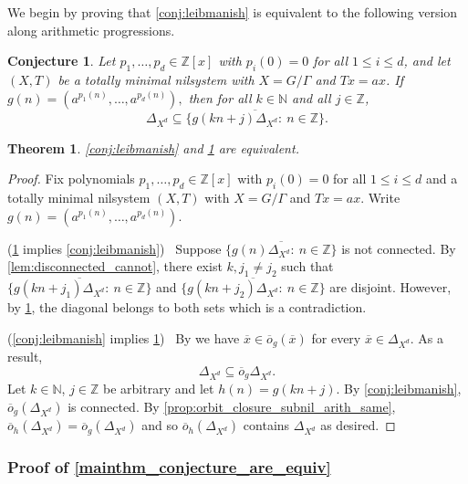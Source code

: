 \documentclass{article}
\theoremstyle{plain}
\newtheorem{theorem}[Theorem]{Theorem}
\newtheorem{Conjecture}[Theorem]{Conjecture}
\theoremstyle{claim}
\theoremstyle{definition}
\theoremstyle{plain}
\theoremstyle{plain}
\newcommand{\N}{\mathbb{N}}
\newcommand{\Z}{\mathbb{Z}}
\newcommand{\1}{\boldsymbol{1}}
\newcommand{\orb}{\overline{o}}
\begin{document}
We begin by proving that \cref{conj:leibmanish} is equivalent to the following version along arithmetic progressions.

\begin{Conjecture}
\label{lem:connected_pol_first}
Let $p_1, \ldots, p_d \in \Z[x]$ with $p_i(0) = 0$ for all $1 \le i \le d$, and let $(X,T)$ be a totally minimal nilsystem with $X = G/\Gamma$ and $Tx = ax$. If $g(n) = (a^{p_1(n)},\dots,a^{p_d(n)}),$ then for all $k \in \N$ and all $j \in \Z$,
\[
\Delta_{X^d} \subseteq \overline{\{g(kn+j) \Delta_{X^{d}}: \ n \in \Z\}}.
\]
\end{Conjecture}




\begin{theorem}
\label{thm:leibman_nil_equiv}
\cref{conj:leibmanish} and \cref{lem:connected_pol_first} are equivalent.
\end{theorem}

\begin{proof}
Fix polynomials $p_1,\dots,p_d \in \Z[x]$ with $p_i(0) = 0$ for all $1 \le i \le d$ and a totally minimal nilsystem $(X,T)$ with $X = G/\Gamma$ and $Tx = ax$. Write $g(n) = (a^{p_1(n)},\dots,a^{p_d(n)})$.

(\cref{lem:connected_pol_first} implies \cref{conj:leibmanish}) \ 
Suppose $\overline{\{g(n) \Delta_{X^d}: \ n \in \Z\}}$ is not connected. 
By \cref{lem:disconnected_cannot}, there exist $k, j_1 \neq j_2$ such that $\overline{\{g(kn + j_1) \Delta_{X^d}: \ n \in \Z\}}$ and $\overline{\{g(kn + j_2) \Delta_{X^d}: \ n \in \Z\}}$ are disjoint. However, by \cref{lem:connected_pol_first}, the diagonal belongs to both sets which is a contradiction.


(\cref{conj:leibmanish} implies \cref{lem:connected_pol_first}) \ 
By \cite{Bergelson_Leibman_Lesigne08} we have $\overline{x} \in \orb_g(\overline{x})$ for every $\overline{x} \in \Delta_{X^d}$.
As a result,
\[
\Delta_{X^d} \subseteq \orb_g \Delta_{X^d}.
\]
Let $k \in \N$, $j \in \Z$ be arbitrary and let $h(n) = g(kn + j)$. By \cref{conj:leibmanish}, $\orb_g(\Delta_{X^d})$ is connected. By \cref{prop:orbit_closure_subnil_arith_same}, $\orb_h(\Delta_{X^d}) = \orb_g(\Delta_{X^d})$ and so $\orb_h(\Delta_{X^d})$ contains $\Delta_{X^d}$ as desired.
\end{proof}


\subsubsection{Proof of \texorpdfstring{\cref{mainthm_conjecture_are_equiv}}{Theorem E}}
\end{document}
